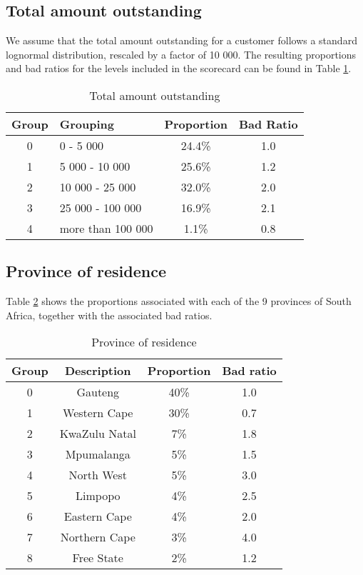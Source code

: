 \documentclass{article}
\theoremstyle{def}
\begin{document}
\subsection{Total amount outstanding}

We assume that the total amount outstanding for a customer follows a standard lognormal distribution, rescaled by a factor of 10 000. The resulting proportions and bad ratios for the levels included in the scorecard can be found in Table \ref{AmtOut_param}.
 \begin{table}[H]%
\caption{Total amount outstanding}
\label{AmtOut_param}
\centering
\small
\begin{tabular}{clcc}
\hline
Group & Grouping & Proportion & Bad Ratio \\
\hline
0 & 0 - 5 000 & 24.4\% & 1.0\\
1 & 5 000 - 10 000 & 25.6\% & 1.2\\
2 & 10 000 - 25 000 & 32.0\% & 2.0\\
3 & 25 000 - 100 000 & 16.9\% & 2.1\\
4 & more than 100 000 & 1.1\% & 0.8\\
\hline
\end{tabular}
\end{table}  

\subsection{Province of residence}

Table \ref{Prov_param} shows the proportions associated with each of the 9 provinces of South Africa, together with the associated bad ratios.
\begin{table}[H]%
\caption{Province of residence}
\label{Prov_param}
\centering
\small
\begin{tabular}{cccc}
\hline
Group & Description & Proportion & Bad ratio \\
\hline
0 & Gauteng & 40\%  & 1.0\\
1 & Western Cape & 30\%  & 0.7\\
2 & KwaZulu Natal & 7\% & 1.8\\
3 & Mpumalanga & 5\% & 1.5\\
4 & North West & 5\% & 3.0\\
5 & Limpopo & 4\% & 2.5\\
6 & Eastern Cape & 4\% & 2.0\\
7 & Northern Cape & 3\% & 4.0\\
8 & Free State & 2\% & 1.2\\
\hline
\end{tabular}
\end{table}   
\end{document}
